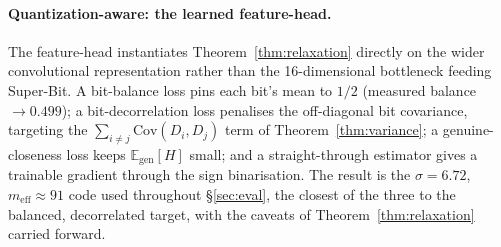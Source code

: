 \paragraph{Quantization-aware: the learned feature-head.}\label{sec:featurehead}

The feature-head instantiates Theorem~\ref{thm:relaxation} directly on the wider convolutional
representation rather than the 16-dimensional bottleneck feeding Super-Bit. A bit-balance loss pins
each bit's mean to $1/2$ (measured balance $\to 0.499$); a bit-decorrelation loss penalises the
off-diagonal bit covariance, targeting the $\sum_{i\neq j}\mathrm{Cov}(D_i,D_j)$ term of
Theorem~\ref{thm:variance}; a genuine-closeness loss keeps $\mathbb{E}_{\mathrm{gen}}[H]$ small; and a
straight-through estimator gives a trainable gradient through the sign binarisation. The result is the
$\sigma = 6.72$, $m_{\mathrm{eff}} \approx 91$ code used throughout \S\ref{sec:eval}, the closest of
the three to the balanced, decorrelated target, with the caveats of Theorem~\ref{thm:relaxation}
carried forward.
